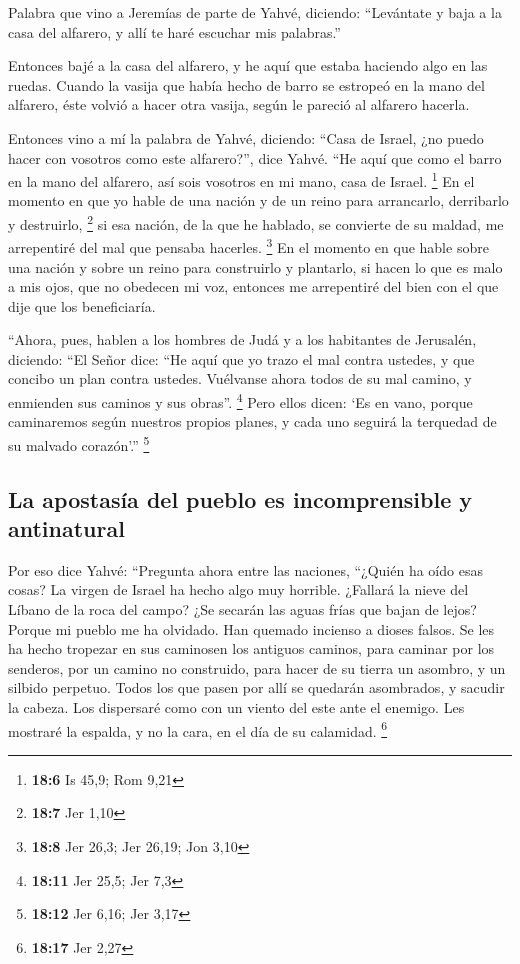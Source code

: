 \begin{paracol}{2}
 Palabra que vino a Jeremías de parte de Yahvé, diciendo:
 ``Levántate y baja a la casa del alfarero, y allí te haré
escuchar mis palabras.''

 Entonces bajé a la casa del alfarero, y he aquí que
estaba haciendo algo en las ruedas.  Cuando la vasija que
había hecho de barro se estropeó en la mano del alfarero, éste volvió a
hacer otra vasija, según le pareció al alfarero hacerla.

 Entonces vino a mí la palabra de Yahvé, diciendo:
 ``Casa de Israel, ¿no puedo hacer con vosotros como este
alfarero?'', dice Yahvé. ``He aquí que como el barro en la mano del
alfarero, así sois vosotros en mi mano, casa de Israel. \footnote{\textbf{18:6}
  Is 45,9; Rom 9,21}  En el momento en que yo hable de una
nación y de un reino para arrancarlo, derribarlo y destruirlo,
\footnote{\textbf{18:7} Jer 1,10}  si esa nación, de la
que he hablado, se convierte de su maldad, me arrepentiré del mal que
pensaba hacerles. \footnote{\textbf{18:8} Jer 26,3; Jer 26,19; Jon 3,10}
 En el momento en que hable sobre una nación y sobre un
reino para construirlo y plantarlo,  si hacen lo que es
malo a mis ojos, que no obedecen mi voz, entonces me arrepentiré del
bien con el que dije que los beneficiaría.

 ``Ahora, pues, hablen a los hombres de Judá y a los
habitantes de Jerusalén, diciendo: ``El Señor dice: ``He aquí que yo
trazo el mal contra ustedes, y que concibo un plan contra ustedes.
Vuélvanse ahora todos de su mal camino, y enmienden sus caminos y sus
obras''. \footnote{\textbf{18:11} Jer 25,5; Jer 7,3} 
Pero ellos dicen: `Es en vano, porque caminaremos según nuestros propios
planes, y cada uno seguirá la terquedad de su malvado corazón'.''
\footnote{\textbf{18:12} Jer 6,16; Jer 3,17}

\hypertarget{la-apostasuxeda-del-pueblo-es-incomprensible-y-antinatural}{%
\subsection{La apostasía del pueblo es incomprensible y
antinatural}\label{la-apostasuxeda-del-pueblo-es-incomprensible-y-antinatural}}

 Por eso dice Yahvé: ``Pregunta ahora entre las naciones,
``¿Quién ha oído esas cosas? La virgen de Israel ha hecho algo muy
horrible.  ¿Fallará la nieve del Líbano de la roca del
campo? ¿Se secarán las aguas frías que bajan de lejos? 
Porque mi pueblo me ha olvidado. Han quemado incienso a dioses falsos.
Se les ha hecho tropezar en sus caminosen los antiguos caminos, para
caminar por los senderos, por un camino no construido, 
para hacer de su tierra un asombro, y un silbido perpetuo. Todos los que
pasen por allí se quedarán asombrados, y sacudir la cabeza.
 Los dispersaré como con un viento del este ante el
enemigo. Les mostraré la espalda, y no la cara, en el día de su
calamidad. \footnote{\textbf{18:17} Jer 2,27}


\end{paracol}
